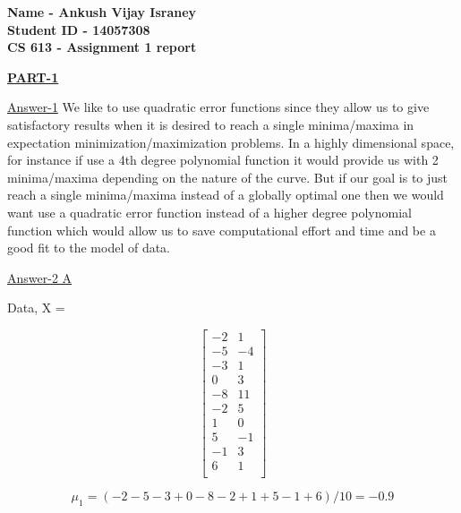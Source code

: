 \documentclass{report}
\begin{document}
 

\begin{flushleft}

\begin{Large}

\textbf{Name - Ankush Vijay Israney} \\
\textbf{Student ID - 14057308} \\
\textbf{CS 613 - Assignment 1 report} \\ 

\end{Large}

\break

\underline { \textbf{PART-1}}  \linebreak[2]

\underline {Answer-1}  \linebreak[2]
We like to use quadratic error functions since they allow us to give satisfactory results when it is desired to reach a single minima/maxima in expectation minimization/maximization problems. In a highly dimensional space, for instance if use a 4th degree polynomial function it would provide us with 2 minima/maxima depending on the nature of the curve. But if our goal is to just reach a single minima/maxima instead of a globally optimal one then we would want use a quadratic error function instead of a higher degree polynomial function which would allow us to save computational effort and time and be a good fit to the model of data.
\linebreak[2]


\underline{Answer-2 A} 
\linebreak[2]

Data, X = 

\[\begin{bmatrix}
-2&1 \\
-5&-4 \\
-3&1 \\
0&3 \\
-8&11 \\
-2&5 \\
1&0 \\
5&-1 \\
-1&3 \\
6&1 \\
\end{bmatrix}\] \linebreak[1]

\begin{equation}
\mu_1 = (-2 -5 -3 + 0 -8 -2 + 1 + 5 -1 +6) / 10 = -0.9 
\end{equation}


\end{flushleft}
\end{document}
